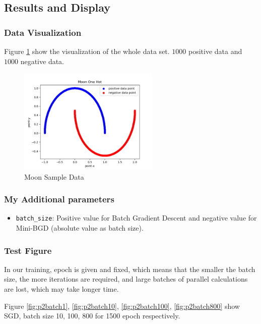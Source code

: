 \documentclass{article}
\begin{document}
\subsection{Results and Display}

\subsubsection{Data Visualization}

Figure \ref{fig:p2sample} show the visualization of the whole data set. $1000$ positive data and $1000$ negative data.

\begin{figure}[!ht]
    \centering
    \includegraphics[width=0.6\textwidth]{img/Part2/sample_data.png}
    \caption{Moon Sample Data}
    \label{fig:p2sample}
\end{figure}

\subsubsection{My Additional parameters}

\begin{itemize}
    \item \texttt{batch\_size}: Positive value for Batch Gradient Descent and negative value for Mini-BGD (absolute value as batch size).
\end{itemize}

\subsubsection{Test Figure}

In our training, epoch is given and fixed, which means that the smaller the batch size, the more iterations are required, and large batches of parallel calculations are lost, which may take longer time.

Figure \ref{fig:p2batch1}, \ref{fig:p2batch10}, \ref{fig:p2batch100}, \ref{fig:p2batch800} show SGD, batch size 10, 100, 800 for 1500 epoch respectively.
\end{document}
